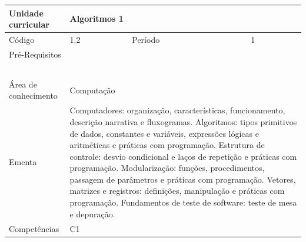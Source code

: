 \begin{quadro}[ht!]
  \centering\scriptsize
\caption{Unidade Curricular Algoritmos 1}

\begin{tabular}{|p{2.5cm}|p{2.5cm}|p{2.5cm}|p{2.5cm}|p{2.5cm}|}\hline

  Unidade curricular & \multicolumn{4}{p{10cm}|}{ Algoritmos 1 }\\\hline
  Código & 1.2 & Período & \multicolumn{2}{p{5cm}|}{ 1 }\\\hline
  Pré-Requisitos & \multicolumn{4}{p{10cm}|}{  } \\\hline
  \cellcolor{blue1}{ CH PRESENCIAL } &
    \cellcolor{blue1}{CH EAD Síncrona} &
    \cellcolor{blue1}{CH EAD Síncrona Mediada} &
    \cellcolor{blue1}{CH EAD Assíncrona} &
    \cellcolor{blue1}{CH APCC} \\\hline
  \cellcolor{blue1}{ 60 } &
    \cellcolor{blue1}{ 0 } &
    \cellcolor{blue1}{ 0 } &
    \cellcolor{blue1}{ 30 } &
    \cellcolor{blue1}{0} \\\hline
  \cellcolor{blue1}{ CH Teórica } &
    \cellcolor{blue1}{CH Prática} &
    \cellcolor{blue1}{CH Humanidades} &
    \cellcolor{blue1}{CH Extensão} &
    \cellcolor{blue1}{CH EAD TOTAL} \\\hline
  \cellcolor{blue1}{ 45 } &
    \cellcolor{blue1}{ 45 } &
    \cellcolor{blue1}{ 0 } &
    \cellcolor{blue1}{ 0 } &
    \cellcolor{blue1}{ 30 } \\\hline
  \cellcolor{blue1}{CARGA-HORÁRIA TOTAL} & \multicolumn{4}{p{10cm}|}{ \cellcolor{blue1}{ 90 } } \\\hline
  Área de conhecimento & \multicolumn{4}{p{10cm}|}{ Computação } \\\hline
  Ementa & \multicolumn{4}{p{10cm}|}{ Computadores: organização, características, funcionamento, descrição narrativa e fluxogramas. Algoritmos: tipos primitivos de dados, constantes e variáveis, expressões lógicas e aritméticas e práticas com programação. Estrutura de controle: desvio condicional e laços de repetição e práticas com programação. Modularização: funções, procedimentos, passagem de parâmetros e práticas com programação. Vetores, matrizes e registros: definições, manipulação e práticas com programação. Fundamentos de teste de software: teste de mesa e depuração. } \\\hline
  Competências & \multicolumn{4}{p{10cm}|}{ C1 } \\\hline


  
	\end{tabular}

\end{quadro}


